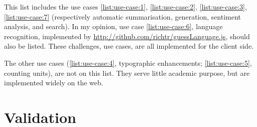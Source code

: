 \medskip\noindent This list includes the use cases \ref{list:use-case:1},
  \ref{list:use-case:2}, \ref{list:use-case:3}, \ref{list:use-case:7}
  (respectively automatic summarisation, generation, sentiment analysis, and
  search).
In my opinion, use case \ref{list:use-case:6}, language recognition,
  implemented by \url{http://github.com/richtr/guessLanguage.js}, should also be listed.
These challenges, use cases, are all implemented for the client side.

The other use cases (\ref{list:use-case:4}, typographic enhancements;
  \ref{list:use-case:5}, counting units), are not on this list.
They serve little academic purpose, but are implemented widely on the
  web.

\section*{Validation}\label{addendum-validation}

\endgroup
